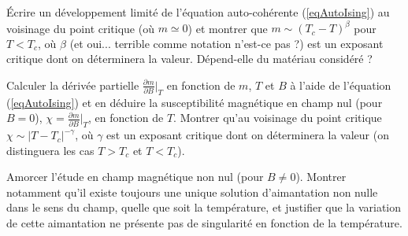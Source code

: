 \documentclass[utf8, 11pt]{feuille}
\begin{document}
\question
\'Ecrire un développement limité de l'équation auto-cohérente (\ref{eqAutoIsing}) au voisinage du point critique (où $m \simeq 0$) et montrer que $m\sim (T_c-T)^{\beta}$ pour $T<T_c$, où $\beta$ (et oui... terrible comme notation n'est-ce pas ?) est un exposant critique dont on déterminera la valeur. Dépend-elle du matériau considéré ?  

\question
Calculer la dérivée partielle $\displaystyle \frac{\partial m}{\partial B}\Big|_{T}$ en fonction de $m$, $T$ et $B$ à l'aide de l'équation (\ref{eqAutoIsing}) et en déduire la susceptibilité magnétique en champ nul (pour $B=0$), $\displaystyle \chi=\frac{\partial m}{\partial B}\Big|_{T}$, en fonction de $T$. Montrer qu'au voisinage du point critique $\chi \sim |T-T_c|^{-\gamma}$, où $\gamma$ est un exposant critique dont on déterminera la valeur (on distinguera les cas $T>T_c$ et $T<T_c$). 

\question
Amorcer l'étude en champ magnétique non nul (pour $B \ne 0$). Montrer notamment qu'il existe toujours une unique solution d'aimantation non nulle dans le sens du champ, quelle que soit la température, et justifier que la variation de cette aimantation ne présente pas de singularité en fonction de la température. 
\end{document}
